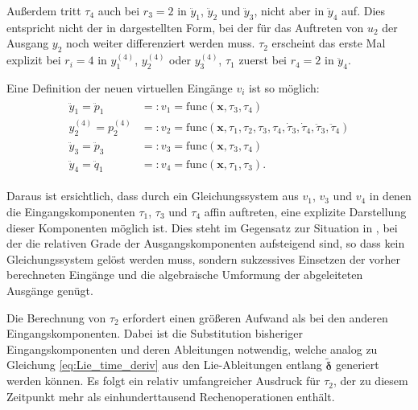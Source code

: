 Außerdem tritt $\tau_4$ auch bei $r_3 = 2$ in $\ddot{y}_1$, $\ddot{y}_2$ und $\ddot{y}_3$, nicht aber in $\ddot{y}_4$ auf. Dies entspricht nicht der in \cite[S. 206]{NLRT_Roebenack} dargestellten Form, bei der für das Auftreten von $u_2$ der Ausgang $y_2$ noch weiter differenziert werden muss. $\tau_2$ erscheint das erste Mal explizit bei $r_i = 4$ in $y_1^{(4)}$, $y_2^{(4)}$ oder $y_3^{(4)}$, $\tau_1$ zuerst bei $r_4 = 2$ in $\ddot{y}_4$.

Eine Definition der neuen virtuellen Eingänge $v_i$ ist so möglich:
\begin{align}
\begin{split}
	\ddot{y}_1 = \ddot{p}_1 &=: v_1 = \mathrm{func}(\mathbf{x}, \tau_3, \tau_4) \\
	y_2^{(4)} = p_2^{(4)} &=: v_2 = \mathrm{func}(\mathbf{x}, \tau_1, \tau_2, \tau_3, \tau_4, \dot{\tau}_3, \dot{\tau}_4, \ddot{\tau}_3, \ddot{\tau}_4) \\
	\ddot{y}_3 = \ddot{p}_3 &=: v_3 = \mathrm{func}(\mathbf{x}, \tau_3, \tau_4) \\
	\ddot{y}_4 = \ddot{q}_1 &=: v_4 = \mathrm{func}(\mathbf{x}, \tau_1, \tau_3) .
\end{split}
\end{align}

Daraus ist ersichtlich, dass durch ein Gleichungssystem aus $v_1$, $v_3$ und $v_4$ in denen die Eingangskomponenten $\tau_1$, $\tau_3$ und $\tau_4$ affin auftreten, eine explizite Darstellung dieser Komponenten möglich ist. Dies steht im Gegensatz zur Situation in \cite[S. 207]{NLRT_Roebenack}, bei der die relativen Grade der Ausgangskomponenten aufsteigend sind, so dass kein Gleichungssystem gelöst werden muss, sondern sukzessives Einsetzen der vorher berechneten Eingänge und die algebraische Umformung der abgeleiteten Ausgänge genügt.
 
Die Berechnung von $\tau_2$ erfordert einen größeren Aufwand als bei den anderen Eingangskomponenten. Dabei ist die Substitution bisheriger Eingangskomponenten und deren Ableitungen notwendig, welche analog zu Gleichung \eqref{eq:Lie_time_deriv} aus den Lie-Ableitungen entlang $\tilde{\boldsymbol{\delta}}$ generiert werden können. Es folgt ein relativ umfangreicher Ausdruck für $\tau_2$, der zu diesem Zeitpunkt mehr als einhunderttausend Rechenoperationen enthält.

